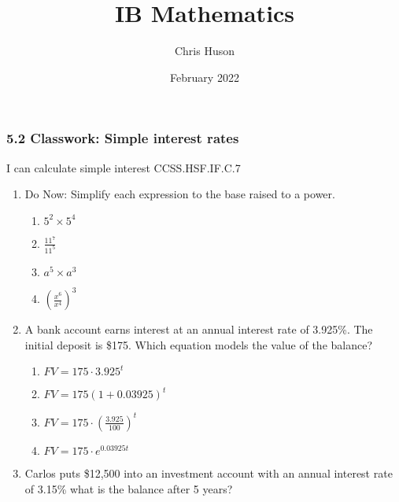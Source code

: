 \documentclass[12pt, twoside]{article}
\title{IB Mathematics}
\author{Chris Huson}
\date{February 2022}
\begin{document}
\subsubsection*{5.2 Classwork: Simple interest rates}
I can calculate simple interest \hfill CCSS.HSF.IF.C.7

\begin{enumerate}
\item Do Now: Simplify each expression to the base raised to a power.
    \begin{multicols}{2}
    \begin{enumerate}[itemsep=0.5cm]
        \item $5^2 \times 5^4$
        \item $\displaystyle \frac{11^7}{11^5}$
        \item $a^5 \times a^3$
        \item $\displaystyle \left( \frac{x^6}{x^4}\right)^{3}$
    \end{enumerate}
    \end{multicols}

\item A bank account earns interest at an annual interest rate of 3.925\%. The initial deposit is \$175. Which equation models the value of the balance?
\begin{multicols}{2}
    \begin{enumerate}[itemsep=0.5cm]
        \item $FV=175 \cdot 3.925^{t}$
        \item $FV=175 (1+0.03925)^{t}$
        \item $\displaystyle FV=175 \cdot \left( \frac{3.925}{100}\right)^{t}$
        \item $FV=175 \cdot e^{0.03925t}$
    \end{enumerate}
\end{multicols}

\item Carlos puts \$12,500 into an investment account with an annual interest rate of 3.15\% what is the balance after 5 years? \vspace{2cm}


\end{enumerate}
\end{document}
